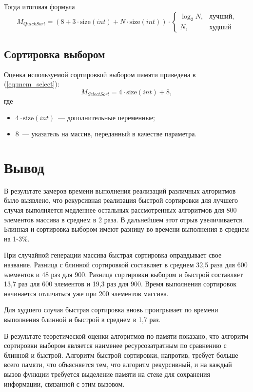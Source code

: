 Тогда итоговая формула
\begin{equation}
	\label{eqn:mem-qsort}
	M_{QuickSort} = (8 + 3 \cdot \text{size}(int) + N \cdot \text{size}(int)) \cdot
	\begin{cases}
		\log_2{N}, & \text{лучший}, \\
		N, & \text{худший}
	\end{cases}
\end{equation}

\subsection{Сортировка выбором}

Оценка используемой сортировкой выбором памяти приведена в (\ref{eq:mem_select}):
\begin{equation}
	\label{eq:mem_select}
	M_{SelectSort} = 4 \cdot \text{size}(int) + 8,
\end{equation}
где
\begin{itemize}
	\item $4 \cdot \text{size}(int)$~--- дополнительные переменные;
	\item $8$~--- указатель на массив, переданный в качестве параметра.
\end{itemize}

\section*{Вывод}
В результате замеров времени выполнения реализаций различных алгоритмов было выявлено, что рекурсивная реализация быстрой сортировки для лучшего случая выполняется медленнее остальных рассмотренных алгоритмов для 800 элементов массива в среднем в 2 раза. В дальнейшем этот отрыв увеличивается. Блинная и сортировка выбором имеют разницу во времени выполнения в среднем на 1-3\%. 

При случайной генерации массива быстрая сортировка оправдывает свое название. Разница с блинной сортировкой составляет в среднем 32,5 раза для 600 элементов и 48 раз для 900. Разница сортировки выбором и быстрой составляет 13,7 раз для 600 элементов и 19,3 раз для 900. Время выполнения сортировок начинается отличаться уже при 200 элементов массива.

Для худшего случая быстрая сортировка вновь проигрывает по времени выполнения блинной и быстрой в среднем в 1,7 раз.

В результате теоретической оценки алгоритмов по памяти показано, что алгоритм сортировки выбором является наименее ресурсозатратным по сравнению с блинной и быстрой.
Алгоритм быстрой сортировки, напротив, требует больше всего памяти, что объясняется тем, что алгоритм рекурсивный, и на каждый вызов функции требуется выделение памяти на стеке для сохранения информации, связанной с этим вызовом.